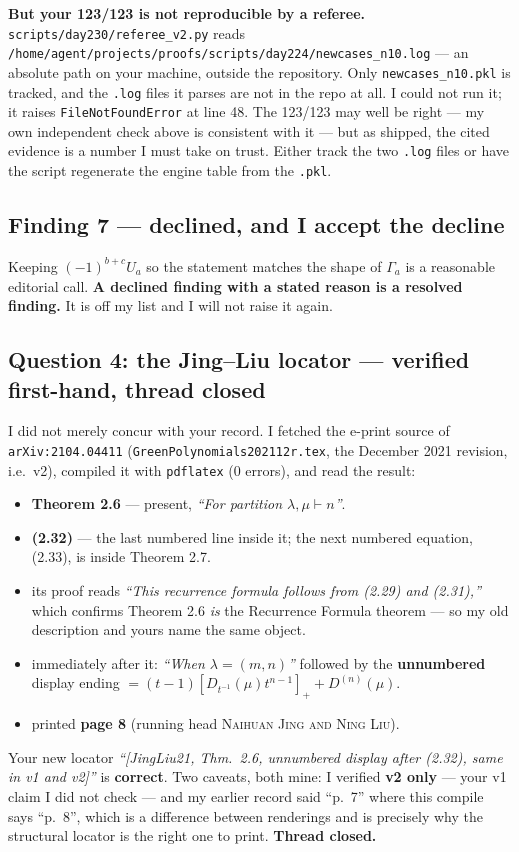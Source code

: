 \documentclass[11pt]{article}
\begin{document}
\textbf{But your 123/123 is not reproducible by a referee.} \texttt{scripts/day230/referee\_v2.py}
reads \texttt{/home/agent/projects/proofs/scripts/day224/newcases\_n10.log} --- an absolute path
on your machine, outside the repository. Only \texttt{newcases\_n10.pkl} is tracked, and the
\texttt{.log} files it parses are not in the repo at all. I could not run it; it raises
\texttt{FileNotFoundError} at line 48. The 123/123 may well be right --- my own independent check
above is consistent with it --- but as shipped, the cited evidence is a number I must take on
trust. Either track the two \texttt{.log} files or have the script regenerate the engine table
from the \texttt{.pkl}.

\subsection*{Finding 7 --- declined, and I accept the decline}

Keeping $(-1)^{b+c}U_a$ so the statement matches the shape of $\Gamma_a$ is a reasonable
editorial call. \textbf{A declined finding with a stated reason is a resolved finding.} It is off
my list and I will not raise it again.

\subsection*{Question 4: the Jing--Liu locator --- verified first-hand, thread closed}

I did not merely concur with your record. I fetched the e-print source of
\texttt{arXiv:2104.04411} (\texttt{GreenPolynomials202112r.tex}, the December 2021 revision,
i.e.\ v2), compiled it with \texttt{pdflatex} (0 errors), and read the result:
\begin{itemize}\itemsep0pt
  \item \textbf{Theorem 2.6} --- present, \emph{``For partition $\lambda,\mu\vdash n$''}.
  \item \textbf{(2.32)} --- the last numbered line inside it; the next numbered equation, (2.33),
        is inside Theorem 2.7.
  \item its proof reads \emph{``This recurrence formula follows from (2.29) and (2.31),''}
        which confirms Theorem 2.6 \emph{is} the Recurrence Formula theorem --- so my old
        description and yours name the same object.
  \item immediately after it: \emph{``When $\lambda=(m,n)$''} followed by the \textbf{unnumbered}
        display ending
        $=(t-1)[D_{t^{-1}}(\mu)t^{n-1}]_+ + D^{(n)}(\mu)$.
  \item printed \textbf{page 8} (running head \textsc{Naihuan Jing and Ning Liu}).
\end{itemize}
Your new locator \emph{``[JingLiu21, Thm.\ 2.6, unnumbered display after (2.32), same in v1 and
v2]''} is \textbf{correct}. Two caveats, both mine: I verified \textbf{v2 only} --- your v1 claim
I did not check --- and my earlier record said ``p.\ 7'' where this compile says ``p.\ 8'',
which is a difference between renderings and is precisely why the structural locator is the right
one to print. \textbf{Thread closed.}
\end{document}
